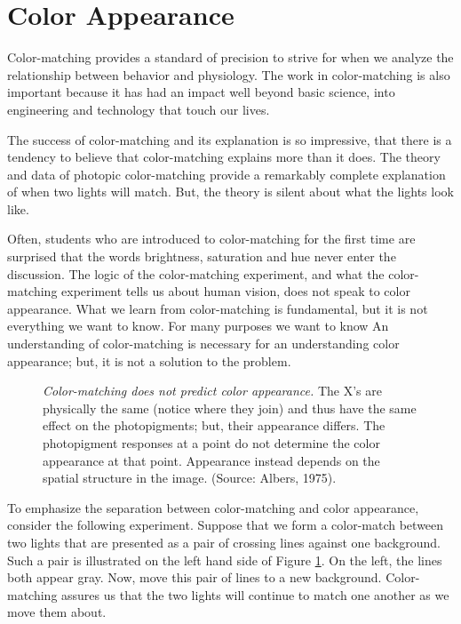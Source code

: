 \section{Color Appearance}

Color-matching provides a standard of precision to strive
for when we analyze the relationship
between behavior and physiology.
The work in color-matching is also important because
it has had an impact well beyond basic science, into
engineering and technology that touch our lives.

The success of color-matching and its
explanation is so impressive,
that there is a tendency to
believe that color-matching explains more than it does.
The theory and data of photopic
color-matching provide a remarkably
complete explanation of when two lights will
match.
But, the theory is silent about what the lights look like.

Often, students who are introduced
to color-matching for the first time
are surprised that the words 
brightness, saturation and hue never enter the discussion.
The logic of the color-matching
experiment, and what the color-matching experiment tells
us about human vision, does not speak to
color appearance.
What we learn from color-matching is fundamental,
but it is not everything we want to know.
For many purposes we want to know 
An understanding of color-matching is necessary
for an understanding color appearance;
but, it is not a solution to the problem.

\begin{figure}
\centerline {
}
\caption[Albers Cross]{
{\em Color-matching does not predict color appearance.}
The X's are physically the same (notice where they join)
and thus have the same effect on the photopigments;
but, their appearance differs.
The photopigment responses at a point do not
determine the color appearance at that point.
Appearance instead depends on the spatial structure in the image.
(Source: Albers, 1975).
}
\label{f3:albers}
\end{figure}
To emphasize the separation between color-matching
and color appearance, consider the following experiment.
Suppose that we form a color-match between two lights
that are presented as a pair of crossing
lines against one background.
Such a pair is illustrated on the left hand side
of Figure \ref{f3:albers}.
On the left, the lines both appear gray.
Now, move this pair of lines
to a new background.
Color-matching assures us that the two lights will
continue to match one another as we move them about.

